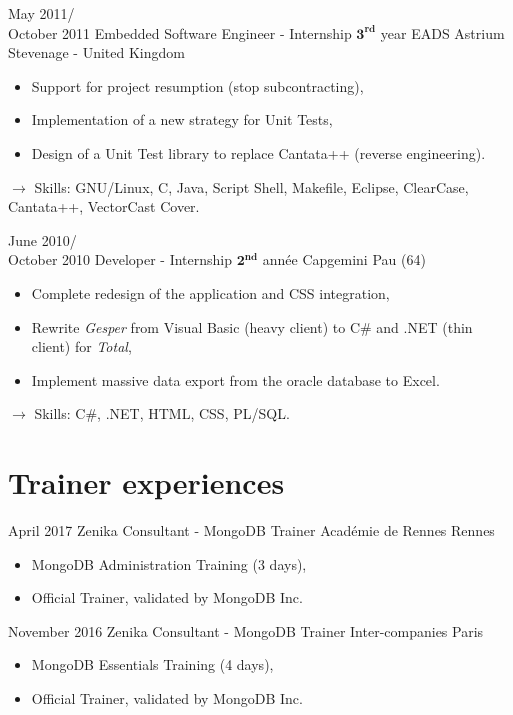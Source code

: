 \documentclass[11pt,a4paper]{moderncv}
\begin{document}
\cventry
{May 2011/\\October 2011}
{Embedded Software Engineer - Internship $\mathbf{3^{rd}}$ year}
{EADS Astrium}
{Stevenage - United Kingdom}
{}
{\begin{itemize}
\item Support for project resumption (stop subcontracting),
\item Implementation of a new strategy for Unit Tests,
\item Design of a Unit Test library to replace Cantata++ (reverse engineering).
\end{itemize}
$\rightarrow$ Skills: GNU/Linux, C, Java, Script Shell, Makefile, Eclipse, ClearCase, Cantata++, VectorCast Cover.
}   %

\cventry
{June 2010/\\October 2010}
{Developer - Internship $\mathbf{2^{nd}}$ année}
{Capgemini}
{Pau (64)}
{}
{\begin{itemize}
\item Complete redesign of the application and CSS integration,
\item Rewrite \emph{Gesper} from Visual Basic (heavy client) to C\# and .NET (thin client) for \emph{Total},
\item Implement massive data export from the oracle database to Excel.
\end{itemize}
$\rightarrow$ Skills: C\#, .NET, HTML, CSS, PL/SQL.
}   %


\section{Trainer experiences}

\cventry
{April 2017}
{Zenika Consultant - MongoDB Trainer}
{Académie de Rennes}
{Rennes}
{}
{\begin{itemize}
\item MongoDB Administration Training (3 days),
\item Official Trainer, validated by MongoDB Inc.
\end{itemize}
}   %

\cventry
{November 2016}
{Zenika Consultant - MongoDB Trainer}
{Inter-companies}
{Paris}
{}
{\begin{itemize}
\item MongoDB Essentials Training (4 days),
\item Official Trainer, validated by MongoDB Inc.
\end{itemize}
}   %
\end{document}
